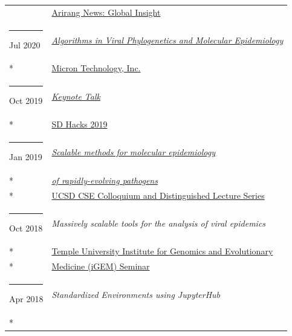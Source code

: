 \documentclass[margin,line]{res}
\begin{document}
\begin{resume}
\begin{longtable}{@{}p{0.7in}p{4in}}
\hspace*{-4mm} & \hspace{4mm} \href{https://www.arirang.com/}{Arirang News: Global Insight}\\
\hspace*{-4mm} \rule{-1mm}{5mm} Jul 2020 & \href{https://www.micron.com/}{\textit{Algorithms in Viral Phylogenetics and Molecular Epidemiology}}\\*
\hspace*{-4mm} & \hspace{4mm} \href{https://www.micron.com/}{Micron Technology, Inc.}\\
\hspace*{-4mm} \rule{-1mm}{5mm} Oct 2019 & \href{https://www.sdhacks.io/}{\textit{Keynote Talk}}\\*
\hspace*{-4mm} & \hspace{4mm} \href{https://www.sdhacks.io/}{SD Hacks 2019}\\
\hspace*{-4mm} \rule{-1mm}{5mm} Jan 2019 & \href{https://cse.ucsd.edu/about/scalable-methods-molecular-epidemiology-rapidly-evolving-pathogens}{\textit{Scalable methods for molecular epidemiology}}\\*
\hspace*{-4mm} & \hspace{4mm} \href{https://cse.ucsd.edu/about/scalable-methods-molecular-epidemiology-rapidly-evolving-pathogens}{\textit{of rapidly-evolving pathogens}}\\*
\hspace*{-4mm} & \hspace{4mm} \href{https://cse.ucsd.edu/about/cse-colloquium-dls/2018-2019}{UCSD CSE Colloquium and Distinguished Lecture Series}\\
\hspace*{-4mm} \rule{-1mm}{5mm} Oct 2018 & \textit{Massively scalable tools for the analysis of viral epidemics}\\*
\hspace*{-4mm} & \hspace{4mm} \href{http://igem.temple.edu/home}{Temple University Institute for Genomics and Evolutionary}\\*
\hspace*{-4mm} & \hspace{4mm} \href{http://igem.temple.edu/home}{Medicine (iGEM) Seminar}\\
\hspace*{-4mm} \rule{-1mm}{5mm} Apr 2018 & \textit{Standardized Environments using JupyterHub}\\*

\end{longtable}
\end{resume}
\end{document}
